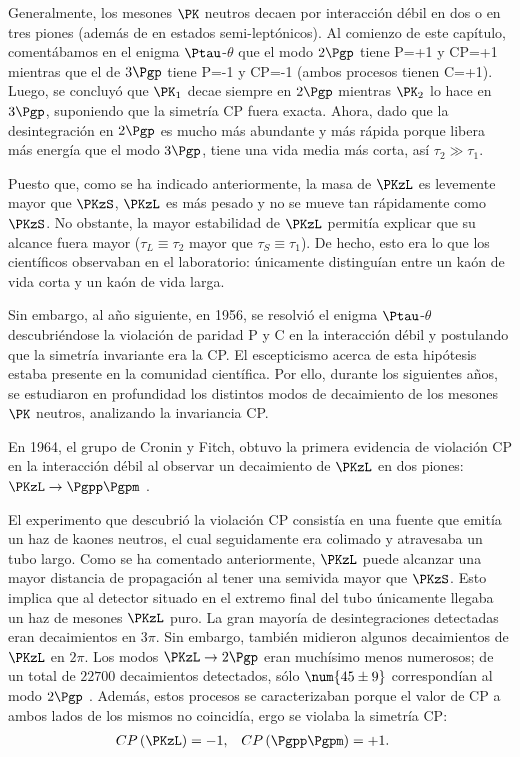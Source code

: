 Generalmente, los mesones $\PK$ neutros decaen por interacción débil en dos o en tres piones (además de en estados semi-leptónicos). Al comienzo de este capítulo, comentábamos en el enigma $\Ptau$-$\theta$ que el modo $2\Pgp$ tiene P=+1 y CP=+1 mientras que el de $3\Pgp$ tiene P=-1 y CP=-1 (ambos procesos tienen C=+1). Luego, se concluyó que $\PK_{1}$ decae siempre en $2\Pgp$ mientras $\PK_{2}$ lo hace en $3\Pgp$, suponiendo que la simetría CP fuera exacta. Ahora, dado que la desintegración en $2\Pgp$ es mucho más abundante y más rápida porque libera más energía que el modo $3\Pgp$, tiene una vida media más corta, así $\tau_{2} \gg \tau_{1}$. 

Puesto que, como se ha indicado anteriormente, la masa de $\PKzL$ es levemente mayor que $\PKzS$, $\PKzL$ es más pesado y no se mueve tan rápidamente como $\PKzS$. No obstante, la mayor estabilidad de $\PKzL$ permitía explicar que su alcance fuera mayor ($\tau_{L}\equiv \tau_{2}$ mayor que $\tau_{S} \equiv \tau_{1}$). De hecho, esto era lo que los científicos observaban en el laboratorio: únicamente distinguían entre un kaón de vida corta y un kaón de vida larga.

Sin embargo, al año siguiente, en 1956, se resolvió el enigma $\Ptau$-$\theta$ descubriéndose la violación de paridad P y C en la interacción débil y postulando que la simetría invariante era la CP. El escepticismo acerca de esta hipótesis estaba presente en la comunidad científica. Por ello, durante los siguientes años, se estudiaron en profundidad los distintos modos de decaimiento de los mesones $\PK$ neutros, analizando la invariancia CP.

En 1964, el grupo de Cronin y Fitch, obtuvo la primera evidencia de violación CP en la interacción débil al observar un decaimiento de $\PKzL$ en dos piones: $\PKzL \rightarrow \Pgpp\Pgpm$ \cite{Cronin}.

El experimento que descubrió la violación CP consistía en una fuente que emitía un haz de kaones neutros, el cual seguidamente era colimado y atravesaba un tubo largo. Como se ha comentado anteriormente, $\PKzL$ puede alcanzar una mayor distancia de propagación al tener una semivida mayor que $\PKzS$. Esto implica que al detector situado en el extremo final del tubo únicamente llegaba un haz de mesones $\PKzL$ puro. La gran mayoría de desintegraciones detectadas eran decaimientos en $3\pi$. Sin embargo, también midieron algunos decaimientos de $\PKzL$ en $2\pi$. Los modos $\PKzL \rightarrow 2\Pgp$ eran muchísimo menos numerosos; de un total de $\num{22700}$ decaimientos detectados, sólo $\num{45 \pm 9}$ correspondían al modo $2\Pgp$ \cite{Cronin}. Además, estos procesos se caracterizaban porque el valor de CP a ambos lados de los mismos no coincidía, ergo se violaba la simetría CP:
\begin{align}
CP\left(\PKzL\right) &=-1, & CP\left(\Pgpp\Pgpm\right) &= +1.
\end{align}

